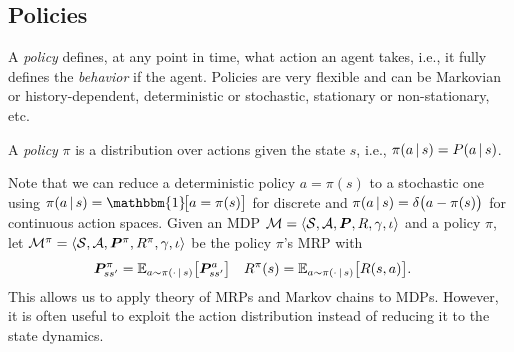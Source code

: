		\subsection{Policies}
			A \emph{policy} defines, at any point in time, what action an agent takes, i.e., it fully defines the \emph{behavior} if the agent. Policies are very flexible and can be Markovian or history-dependent, deterministic or stochastic, stationary or non-stationary, etc.
			\begin{definition}[Policy]
				A \emph{policy} \(\pi\) is a distribution over actions given the state \(s\), i.e., \( \pi(a \,\vert\, s) = P(a \,\vert\, s) \).
			\end{definition}
			Note that we can reduce a deterministic policy \( a = \pi(s) \) to a stochastic one using \( \pi(a \given s) = \mathbbm{1}\!\bigl[ a = \pi(s) \bigr] \) for discrete and \( \pi(a \,\vert\, s) = \delta\bigl( a - \pi(s) \bigr) \) for continuous action spaces. Given an \ac{MDP} \( \mathcal{M} = \langle \mathcal{S}, \mathcal{A}, \bm{P}, R, \gamma, \iota \rangle \) and a policy \(\pi\), let \( \mathcal{M}^\pi = \langle \mathcal{S}, \mathcal{A}, \bm{P}^\pi, R^\pi, \gamma, \iota \rangle \) be the policy \(\pi\)'s \ac{MRP} with
			\begin{align}
				\bm{P}_{ss'}^\pi & = \mathbb{E}_{a \sim \pi(\cdot \,\vert\, s)}\bigl[ \bm{P}_{ss'}^a \bigr] &
				R^\pi(s)          & = \mathbb{E}_{a \sim \pi(\cdot \,\vert\, s)}\bigl[ R(s, a) \bigr].
				\label{eq:mdpToMrp}
			\end{align}
			This allows us to apply theory of \acp{MRP} and Markov chains to \acp{MDP}. However, it is often useful to exploit the action distribution instead of reducing it to the state dynamics.

